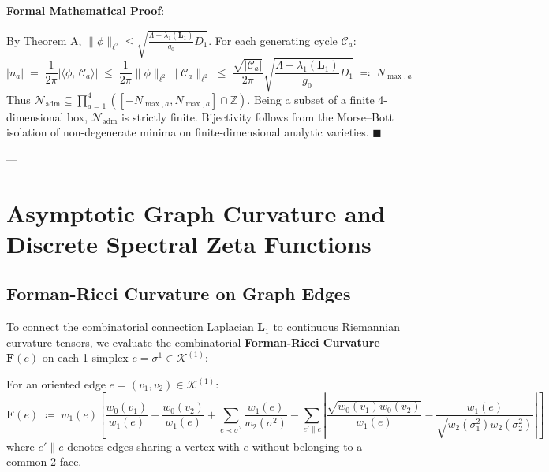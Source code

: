 \documentclass[
    12pt,
    a4paper,
    headings=normal,
    twoside=false,
    open=any,
    parskip=half
]{scrbook}
\newcommand{\spectrumN}{\mathcal{N}_{\text{adm}}}
\newenvironment{myproof}[1][]{%
  \par\vspace{6pt}\noindent\textbf{\sffamily\color{maincolor}Formal Mathematical Proof\ifstrempty{#1}{}{ (#1)}}:\par\nopagebreak
}{%
  \penalty50\hfill\ensuremath{\blacksquare}\par\vspace{6pt}
}
\begin{document}
\begin{myproof}
By Theorem A, $\|\phi\|_{\ell^2} \le \sqrt{\frac{\Lambda - \lambda_1(\mathbf{L}_1)}{g_0} D_1}$. For each generating cycle $\mathcal{C}_a$:
\begin{equation*}
|n_a| \;=\; \frac{1}{2\pi} |\langle \phi, \, \mathcal{C}_a \rangle| \;\le\; \frac{1}{2\pi} \|\phi\|_{\ell^2} \|\mathcal{C}_a\|_{\ell^2} \;\le\; \frac{\sqrt{|\mathcal{C}_a|}}{2\pi} \sqrt{\frac{\Lambda - \lambda_1(\mathbf{L}_1)}{g_0} D_1} \;\eqqcolon\; N_{\max, a}
\end{equation*}
Thus $\spectrumN \subseteq \prod_{a=1}^4 ([-N_{\max, a}, N_{\max, a}] \cap \mathbb{Z})$. Being a subset of a finite 4-dimensional box, $\spectrumN$ is strictly finite. Bijectivity follows from the Morse--Bott isolation of non-degenerate minima on finite-dimensional analytic varieties.
\end{myproof}

---

\section{Asymptotic Graph Curvature and Discrete Spectral Zeta Functions}
\label{sec:ch1_asymptotic_expansion_wilsonian_action}

\subsection{Forman-Ricci Curvature on Graph Edges}

To connect the combinatorial connection Laplacian $\mathbf{L}_1$ to continuous Riemannian curvature tensors, we evaluate the combinatorial \textbf{Forman-Ricci Curvature} $\mathbf{F}(e)$ on each 1-simplex $e = \sigma^1 \in \mathcal{K}^{(1)}$:

\begin{physdefinition}\label{def:ch1_forman_ricci}
For an oriented edge $e = (v_1, v_2) \in \mathcal{K}^{(1)}$:
\begin{equation}
\mathbf{F}(e) \;\coloneqq\; w_1(e) \left[ \frac{w_0(v_1)}{w_1(e)} + \frac{w_0(v_2)}{w_1(e)} + \sum_{e \prec \sigma^2} \frac{w_1(e)}{w_2(\sigma^2)} - \sum_{e' \parallel e} \left| \frac{\sqrt{w_0(v_1)w_0(v_2)}}{w_1(e)} - \frac{w_1(e)}{\sqrt{w_2(\sigma_1^2)w_2(\sigma_2^2)}} \right| \right]
\label{eq:ch1_forman_ricci_def}
\end{equation}
where $e' \parallel e$ denotes edges sharing a vertex with $e$ without belonging to a common 2-face.
\end{physdefinition}
\end{document}
